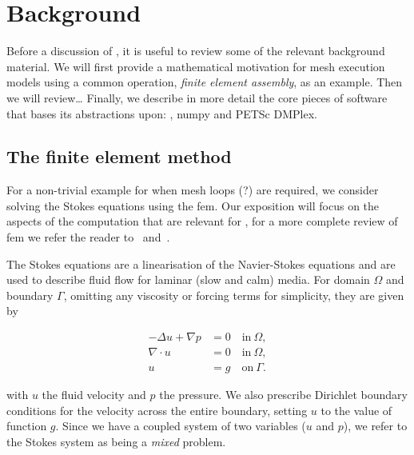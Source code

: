 \documentclass[thesis]{subfiles}
\begin{document}
\chapter{Background}
\label{chapter:background}

Before a discussion of , it is useful to review some of the relevant background material.
We will first provide a mathematical motivation for mesh execution models using a common operation, \textit{finite element assembly}, as an example.
Then we will review\dots
Finally, we describe in more detail the core pieces of software that  bases its abstractions upon: , numpy and PETSc DMPlex.

\section{The finite element method}

For a non-trivial example for when mesh loops (?) are required, we consider solving the Stokes equations using the \gls{fem}.
Our exposition will focus on the aspects of the computation that are relevant for , for a more complete review of \gls{fem} we refer the reader to~\cite{brennerMathematicalTheoryFinite2008} and~\cite{larsonFiniteElementMethod2013}.

The Stokes equations are a linearisation of the Navier-Stokes equations and are used to describe fluid flow for laminar (slow and calm) media.
For domain $\Omega$ and boundary $\Gamma$, omitting any viscosity or forcing terms for simplicity, they are given by

\begin{subequations}
  \begin{align}
    - \Delta u + \nabla p &= 0 \quad \textrm{in} \ \Omega, \\
    \nabla \cdot u &= 0 \quad \textrm{in} \ \Omega, \\
    u &= g \quad \textrm{on} \ \Gamma.
  \end{align}
  \label{eq:strong_stokes}
\end{subequations}

with $u$ the fluid velocity and $p$ the pressure.
We also prescribe Dirichlet boundary conditions for the velocity across the entire boundary, setting $u$ to the value of function $g$.
Since we have a coupled system of two variables ($u$ and $p$), we refer to the Stokes system as being a \textit{mixed} problem.
\end{document}
